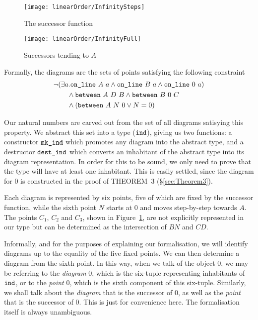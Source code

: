 \begin{figure}
\centering\texttt{[image: linearOrder/InfinitySteps]}
\caption{The successor function}
\label{fig:successor}
\end{figure}

\begin{figure}
\centering\texttt{[image: linearOrder/InfinityFull]}
\caption{Successors tending to $A$}
\label{fig:FullSuccessor}
\end{figure}

Formally, the diagrams are the sets of points satisfying the following constraint
\begin{align}
&\neg(\exists a.\texttt{on\_line}\ A\ a\wedge \texttt{on\_line}\ B\ a\wedge \texttt{on\_line}\ 0\ a) \label{theorem:IndConstraint}\\
&\qquad\wedge \texttt{between}\ A\ D\ B \wedge \texttt{between}\ B\ 0\ C\notag\\
&\qquad\wedge (\texttt{between}\ A\ N\ 0 \vee N = 0)\notag
\end{align}

Our natural numbers are carved out from the set of all diagrams satisying this property. We abstract this set into a type ($\texttt{ind}$), giving us two functions: a constructor $\texttt{mk\_ind}$ which promotes any diagram into the abstract type, and a destructor $\texttt{dest\_ind}$ which converts an inhabitant of the abstract type into its diagram representation. In order for this to be sound, we only need to prove that the type will have at least one inhabitant. This is easily settled, since the diagram for $0$ is constructed in the proof of THEOREM~3 (\S\ref{sec:Theorem3}). 

Each diagram is represented by six points, five of which are fixed by the successor function, while the sixth point $N$ starts at $0$ and moves step-by-step towards $A$. The points $C_1$, $C_2$ and $C_3$, shown in Figure~\ref{fig:successor}, are not explicitly represented in our type but can be determined as the intersection of $BN$ and $CD$.

Informally, and for the purposes of explaining our formalisation, we will identify diagrams up to the equality of the five fixed points. We can then determine a diagram from the sixth point. In this way, when we talk of the object $0$, we may be referring to the \emph{diagram} 0, which is the six-tuple representing inhabitants of $\texttt{ind}$, or to the \emph{point} 0, which is the sixth component of this six-tuple. Similarly, we shall talk about the \emph{diagram} that is the successor of 0, as well as the \emph{point} that is the successor of 0. This is just for convenience here. The formalisation itself is always unambiguous.

